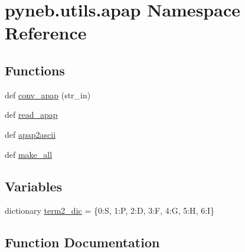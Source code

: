 \hypertarget{namespacepyneb_1_1utils_1_1apap}{}\section{pyneb.\+utils.\+apap Namespace Reference}
\label{namespacepyneb_1_1utils_1_1apap}
\subsection*{Functions}
\begin{DoxyCompactItemize}
\item 
def \hyperlink{namespacepyneb_1_1utils_1_1apap_ad78f65e1ca140daa8a34fd88a91db97a}{conv\+\_\+apap} (str\+\_\+in)
\item 
def \hyperlink{namespacepyneb_1_1utils_1_1apap_ad24a246526c0913b752319c5a2846412}{read\+\_\+apap}
\item 
def \hyperlink{namespacepyneb_1_1utils_1_1apap_a4fccb2b8771d515b0be6f8a1921c0c58}{apap2ascii}
\item 
def \hyperlink{namespacepyneb_1_1utils_1_1apap_ac957f753a8fc1c667044b4324868753e}{make\+\_\+all}
\end{DoxyCompactItemize}
\subsection*{Variables}
\begin{DoxyCompactItemize}
\item 
dictionary \hyperlink{namespacepyneb_1_1utils_1_1apap_aba49aa2681eafa29fc85cb550e4ce28a}{term2\+\_\+dic} = \{\textquotesingle{}0\textquotesingle{}\+:\textquotesingle{}S\textquotesingle{}, \textquotesingle{}1\textquotesingle{}\+:\textquotesingle{}P\textquotesingle{}, \textquotesingle{}2\textquotesingle{}\+:\textquotesingle{}D\textquotesingle{}, \textquotesingle{}3\textquotesingle{}\+:\textquotesingle{}F\textquotesingle{}, \textquotesingle{}4\textquotesingle{}\+:\textquotesingle{}G\textquotesingle{}, \textquotesingle{}5\textquotesingle{}\+:\textquotesingle{}H\textquotesingle{}, \textquotesingle{}6\textquotesingle{}\+:\textquotesingle{}I\textquotesingle{}\}
\end{DoxyCompactItemize}


\subsection{Function Documentation}
\hypertarget{namespacepyneb_1_1utils_1_1apap_a4fccb2b8771d515b0be6f8a1921c0c58}{}
